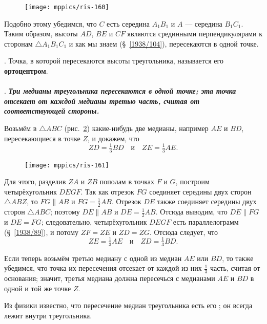 \documentclass[twoside]{book}
\makeatletter
\newcommand{\rindex}[2][\imki@jobname]{%
  \index[#1]{\detokenize{#2}}%
}
\makeatother
\begin{document}
\begin{figure}
\centering
\texttt{[image: mppics/ris-160]}
\caption{}\label{1938/ris-160}
\end{figure}


Подобно этому убедимся, что $C$ есть середина $A_1B_1$ и $A$ — середина $B_1C_1$.
Таким образом, высоты $AD$, $BE$ и $CF$ являются
срединными перпендикулярами к сторонам $\triangle A_1B_1C_1$ и как мы знаем (§~\ref{1938/104}), пересекаются в одной точке.

\smallskip
\mbox{.}
Точка, в которой пересекаются высоты треугольника, называется его \rindex{ортоцентр}\textbf{ортоцентром}.

\paragraph{}\label{1938/143} 
.
\textbf{\emph{Три медианы треугольника пересекаются в одной точке;
эта точка отсекает от каждой медианы третью часть, считая от соответствующей стороны.}}

Возьмём в $\triangle ABC$ (рис.~\ref{1938/ris-161}) какие-нибудь две медианы, например $AE$ и $BD$, пересекающиеся в точке $Z$, и докажем, что
\[ZD=\tfrac13 BD\quad\text{и}\quad ZE = \tfrac13 AE.\]

\begin{figure}
\vskip-0mm
\centering
\texttt{[image: mppics/ris-161]}
\caption{}\label{1938/ris-161}
\end{figure}


Для этого, разделив $ZA$ и $ZB$ пополам в точках $F$ и $G$, построим четырёхугольник $DEGF$.
Так как отрезок $FG$ соединяет середины двух сторон $\triangle ABZ$, то $FG\parallel AB$ и $FG=\tfrac12 AB$.
Отрезок $DE$ также соединяет середины двух сторон $\triangle ABC$;
поэтому $DE\parallel AB$ и $DE=\tfrac12 AB$.
Отсюда выводим, что $DE \parallel FG$ и $DE=FG$;
следовательно, четырёхугольник $DEGF$ есть параллелограмм (§~\ref{1938/89}), и потому $ZF=ZE$ и $ZD=ZG$.
Отсюда следует, что
\[ ZE=\tfrac13AE\quad\text{и}\quad ZD=\tfrac13 BD.\]

Если теперь возьмём третью медиану с одной из медиан $AE$ или $BD$, то также убедимся, что точка их пересечения отсекает от каждой из них $\tfrac13$ часть, считая от основания;
значит, третья медиана должна пересечься с медианами $AE$ и $BD$ в одной и той же точке $Z$.

Из физики известно, что пересечение медиан треугольника есть его ;
он всегда лежит внутри треугольника.
\end{document}
